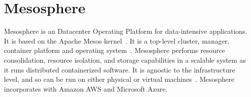 \section{Mesosphere}

Mesosphere is an Datacenter Operating Platform for 
data-intensive applications. It is based on the Apache Mesos 
kernel~\cite{hid-sp18-404-Concepts2018}. It is a top-level 
cluster, manager, container platform and operating system~\cite{hid-sp18-404-Features2018}. 
Mesosphere performs resource consolidation, resource isolation, 
and storage capabilities in a scalable system as it runs distributed 
containerized software. It is agnostic to the infrastructure level, 
and so can be run on either physical or virtual machines~\cite{hid-sp18-404-Architecture2018}. 
Mesosphere incorporates with Amazon AWS and Microsoft Azure.
